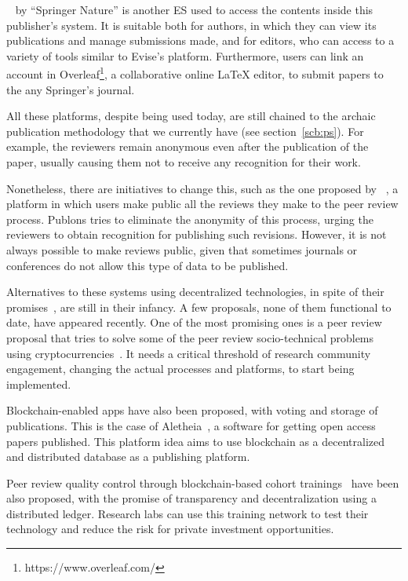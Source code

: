 ~\cite{myspringer} by ``Springer Nature'' is another ES used to
access the contents inside this publisher's system. It is suitable both for
authors, in which they can view its publications and manage submissions made,
and for editors, who can access to a variety of tools similar to Evise's
platform. Furthermore, users can link an account in
Overleaf\footnote{https://www.overleaf.com/}, a collaborative online \LaTeX
editor, to submit papers to the any Springer's journal.

All these platforms, despite being used today, are still chained to the archaic
publication methodology that we currently have (see section~\ref{scb:ps}). For
example, the reviewers remain anonymous even after the publication of the paper,
usually causing them not to receive any recognition for their work.

Nonetheless, there are initiatives to change this, such as the one proposed by
~\cite{rajpert2016rewarding}, a platform in which users make public
all the reviews they make to the peer review process. Publons tries to eliminate
the anonymity of this process, urging the reviewers to obtain recognition for
publishing such revisions. However, it is not always possible to make reviews
public, given that sometimes journals or conferences do not allow this type of
data to be published.

Alternatives to these systems using decentralized technologies, in spite of
their promises~\cite{bartlingblockchain}, are still in their infancy. A few
proposals, none of them functional to date, have appeared recently. One of the
most promising ones is a peer review proposal that tries to solve some of the
peer review socio-technical problems using
cryptocurrencies~\cite{tennant2017multi}. It needs a critical threshold of
research community engagement, changing the actual processes and platforms, to
start being implemented.

Blockchain-enabled apps have also been proposed, with voting and storage of
publications. This is the case of Aletheia~\cite{morton2017aletheia}, a software
for getting open access papers published. This platform idea aims to use
blockchain as a decentralized and distributed database as a publishing platform.

Peer review quality control through blockchain-based cohort
trainings~\cite{dhillon2016bench} have been also proposed, with the promise of
transparency and decentralization using a distributed ledger. Research labs can
use this training network to test their technology and reduce the risk for
private investment opportunities.

